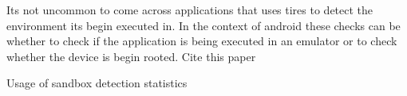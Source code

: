 \documentclass[../main.tex]{subfile}
\begin{document}
	
	Its not uncommon to come across applications that uses tires to detect the environment its begin executed in. In the context of android these checks can be whether to check if the application is being executed in an emulator or to check whether the device is begin rooted. Cite this paper \cite{geist2016jailbreak} \cite{sun2015android} \cite{lim2016android}
	
	Usage of sandbox detection statistics \cite{amro2018malware}
	
	
	
			
\end{document}
